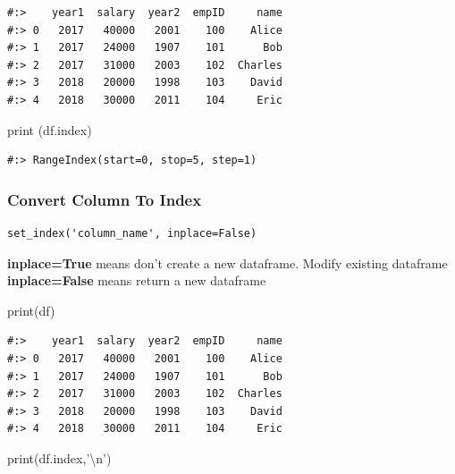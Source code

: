 \documentclass[
]{book}
\newenvironment{Shaded}{\begin{snugshade}}{\end{snugshade}}
\newcommand{\BuiltInTok}[1]{#1}
\newcommand{\CharTok}[1]{\textcolor[rgb]{0.5,0.5,0.5}{#1}}
\newcommand{\NormalTok}[1]{#1}
\newcommand{\StringTok}[1]{\textcolor[rgb]{0.5,0.5,0.5}{#1}}
\begin{document}
\begin{verbatim}
#:>    year1  salary  year2  empID     name
#:> 0   2017   40000   2001    100    Alice
#:> 1   2017   24000   1907    101      Bob
#:> 2   2017   31000   2003    102  Charles
#:> 3   2018   20000   1998    103    David
#:> 4   2018   30000   2011    104     Eric
\end{verbatim}

\begin{Shaded}
\begin{Highlighting}[]
\BuiltInTok{print}\NormalTok{ (df.index)}
\end{Highlighting}
\end{Shaded}

\begin{verbatim}
#:> RangeIndex(start=0, stop=5, step=1)
\end{verbatim}

\hypertarget{convert-column-to-index}{%
\subsubsection{Convert Column To Index}\label{convert-column-to-index}}

\begin{verbatim}
set_index('column_name', inplace=False)
\end{verbatim}

\textbf{inplace=True} means don't create a new dataframe. Modify existing dataframe\\
\textbf{inplace=False} means return a new dataframe

\begin{Shaded}
\begin{Highlighting}[]
\BuiltInTok{print}\NormalTok{(df)}
\end{Highlighting}
\end{Shaded}

\begin{verbatim}
#:>    year1  salary  year2  empID     name
#:> 0   2017   40000   2001    100    Alice
#:> 1   2017   24000   1907    101      Bob
#:> 2   2017   31000   2003    102  Charles
#:> 3   2018   20000   1998    103    David
#:> 4   2018   30000   2011    104     Eric
\end{verbatim}

\begin{Shaded}
\begin{Highlighting}[]
\BuiltInTok{print}\NormalTok{(df.index,}\StringTok{'}\CharTok{\textbackslash{}n}\StringTok{'}\NormalTok{)}
\end{Highlighting}
\end{Shaded}
\end{document}
